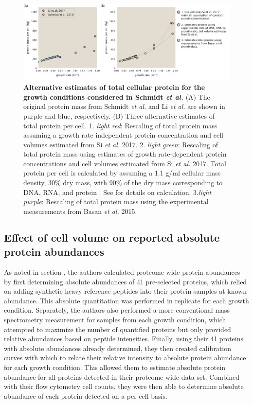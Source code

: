 \begin{figure}
		\centering
    \includegraphics[width=1\textwidth]{SI_figs/schmidt_protein_corrections.pdf}
  \caption{{\bf Alternative estimates of total cellular protein for the growth conditions
    considered in Schmidt \textit{et al.}} (A) The original protein mass from
    Schmidt \textit{et al.} and Li \textit{et al.} are shown in purple and blue,
    respectively. (B) Three alternative estimates of total protein per cell.
		1.  \textit{light red}: Rescaling of total protein mass assuming a
    growth rate independent protein concentration and cell volumes estimated
    from Si \textit{et al.} 2017. 2. \textit{light green}:  Rescaling of total protein
    mass using estimates of growth rate-dependent protein concentrations and
    cell volumes estimated from Si \textit{et al.} 2017. Total protein per cell
		is calculated by assuming a 1.1 g/ml cellular mass density, 30\% dry mass, with
		90\% of the dry mass corresponding to DNA, RNA, and protein \citep{basan2015}. See
		 for details on calculation. 3.\textit{light purple}: Rescaling
    of total protein mass using the experimental measurements from Basan
    \textit{et al.} 2015.
	 	}
  \label{fig:schmidt_adjustment_summary}
\end{figure}

\subsection{Effect of cell volume on reported absolute protein abundances}

As noted in section ,
the authors calculated proteome-wide protein abundances by first determining
absolute abundances of 41 pre-selected proteins, which relied on adding
synthetic heavy reference peptides into their protein samples at known abundance.  This
absolute quantitation was performed in replicate for each growth condition.
Separately, the authors also performed a more conventional mass spectrometry
measurement for samples from each growth condition, which attempted to maximize
the number of quantified proteins but only provided relative abundances based on
peptide intensities. Finally, using their 41 proteins with absolute abundances
already determined, they then created calibration curves with which to relate
their relative intensity to absolute protein abundance for each growth
condition.  This allowed them to estimate absolute protein abundance for all
proteins detected in their proteome-wide data set. Combined with their flow
cytometry cell counts, they were then able to determine absolute abundance of
each protein detected on a per cell basis.

